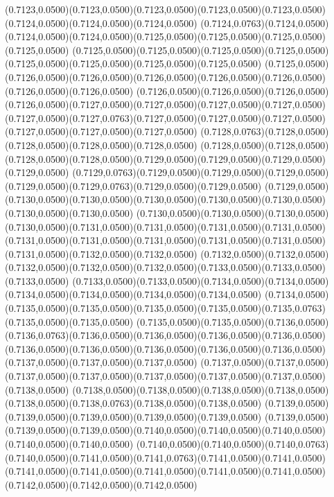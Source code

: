 (0.7123,0.0500)(0.7123,0.0500)(0.7123,0.0500)(0.7123,0.0500)(0.7123,0.0500)(0.7124,0.0500)(0.7124,0.0500)(0.7124,0.0500)
(0.7124,0.0763)(0.7124,0.0500)(0.7124,0.0500)(0.7124,0.0500)(0.7125,0.0500)(0.7125,0.0500)(0.7125,0.0500)(0.7125,0.0500)
(0.7125,0.0500)(0.7125,0.0500)(0.7125,0.0500)(0.7125,0.0500)(0.7125,0.0500)(0.7125,0.0500)(0.7125,0.0500)(0.7125,0.0500)
(0.7125,0.0500)(0.7126,0.0500)(0.7126,0.0500)(0.7126,0.0500)(0.7126,0.0500)(0.7126,0.0500)(0.7126,0.0500)(0.7126,0.0500)
(0.7126,0.0500)(0.7126,0.0500)(0.7126,0.0500)(0.7126,0.0500)(0.7127,0.0500)(0.7127,0.0500)(0.7127,0.0500)(0.7127,0.0500)
(0.7127,0.0500)(0.7127,0.0763)(0.7127,0.0500)(0.7127,0.0500)(0.7127,0.0500)(0.7127,0.0500)(0.7127,0.0500)(0.7127,0.0500)
(0.7128,0.0763)(0.7128,0.0500)(0.7128,0.0500)(0.7128,0.0500)(0.7128,0.0500)
\PST@Solid(0.7128,0.0500)(0.7128,0.0500)(0.7128,0.0500)(0.7128,0.0500)(0.7129,0.0500)(0.7129,0.0500)(0.7129,0.0500)(0.7129,0.0500)
(0.7129,0.0763)(0.7129,0.0500)(0.7129,0.0500)(0.7129,0.0500)(0.7129,0.0500)(0.7129,0.0763)(0.7129,0.0500)(0.7129,0.0500)
(0.7129,0.0500)(0.7130,0.0500)(0.7130,0.0500)(0.7130,0.0500)(0.7130,0.0500)(0.7130,0.0500)(0.7130,0.0500)(0.7130,0.0500)
(0.7130,0.0500)(0.7130,0.0500)(0.7130,0.0500)(0.7130,0.0500)(0.7131,0.0500)(0.7131,0.0500)(0.7131,0.0500)(0.7131,0.0500)
(0.7131,0.0500)(0.7131,0.0500)(0.7131,0.0500)(0.7131,0.0500)(0.7131,0.0500)(0.7131,0.0500)(0.7132,0.0500)(0.7132,0.0500)
(0.7132,0.0500)(0.7132,0.0500)(0.7132,0.0500)(0.7132,0.0500)(0.7132,0.0500)(0.7133,0.0500)(0.7133,0.0500)(0.7133,0.0500)
(0.7133,0.0500)(0.7133,0.0500)(0.7134,0.0500)(0.7134,0.0500)(0.7134,0.0500)(0.7134,0.0500)(0.7134,0.0500)(0.7134,0.0500)
(0.7134,0.0500)(0.7135,0.0500)(0.7135,0.0500)(0.7135,0.0500)(0.7135,0.0500)(0.7135,0.0763)(0.7135,0.0500)(0.7135,0.0500)
(0.7135,0.0500)(0.7135,0.0500)(0.7136,0.0500)(0.7136,0.0763)(0.7136,0.0500)(0.7136,0.0500)(0.7136,0.0500)(0.7136,0.0500)
(0.7136,0.0500)(0.7136,0.0500)(0.7136,0.0500)(0.7136,0.0500)(0.7136,0.0500)(0.7137,0.0500)(0.7137,0.0500)(0.7137,0.0500)
(0.7137,0.0500)(0.7137,0.0500)(0.7137,0.0500)(0.7137,0.0500)(0.7137,0.0500)(0.7137,0.0500)(0.7137,0.0500)(0.7138,0.0500)
(0.7138,0.0500)(0.7138,0.0500)(0.7138,0.0500)(0.7138,0.0500)(0.7138,0.0500)(0.7138,0.0763)(0.7138,0.0500)(0.7138,0.0500)
(0.7139,0.0500)(0.7139,0.0500)(0.7139,0.0500)(0.7139,0.0500)(0.7139,0.0500)
\PST@Solid(0.7139,0.0500)(0.7139,0.0500)(0.7139,0.0500)(0.7140,0.0500)(0.7140,0.0500)(0.7140,0.0500)(0.7140,0.0500)(0.7140,0.0500)
(0.7140,0.0500)(0.7140,0.0500)(0.7140,0.0763)(0.7140,0.0500)(0.7141,0.0500)(0.7141,0.0763)(0.7141,0.0500)(0.7141,0.0500)
(0.7141,0.0500)(0.7141,0.0500)(0.7141,0.0500)(0.7141,0.0500)(0.7141,0.0500)(0.7142,0.0500)(0.7142,0.0500)(0.7142,0.0500)
